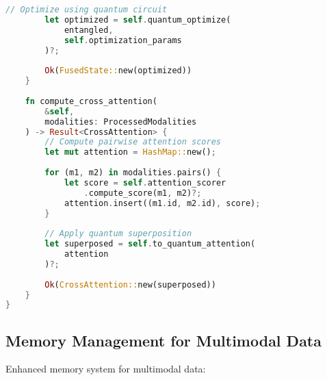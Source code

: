 \documentclass[10pt,twocolumn]{article}
\begin{document}
\begin{lstlisting}[language=Rust]
        // Optimize using quantum circuit
        let optimized = self.quantum_optimize(
            entangled,
            self.optimization_params
        )?;
        
        Ok(FusedState::new(optimized))
    }
    
    fn compute_cross_attention(
        &self,
        modalities: ProcessedModalities
    ) -> Result<CrossAttention> {
        // Compute pairwise attention scores
        let mut attention = HashMap::new();
        
        for (m1, m2) in modalities.pairs() {
            let score = self.attention_scorer
                .compute_score(m1, m2)?;
            attention.insert((m1.id, m2.id), score);
        }
        
        // Apply quantum superposition
        let superposed = self.to_quantum_attention(
            attention
        )?;
        
        Ok(CrossAttention::new(superposed))
    }
}
\end{lstlisting}

\subsection{Memory Management for Multimodal Data}
Enhanced memory system for multimodal data:
\end{document}
